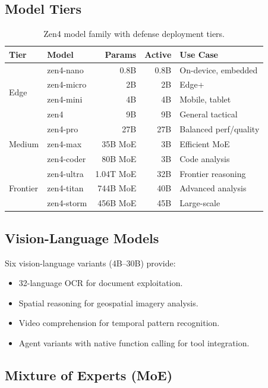\documentclass[11pt,letterpaper]{article}
\begin{document}
\subsection{Model Tiers}

\begin{table}[H]
\centering
\small
\begin{tabular}{@{}llrrl@{}}
\toprule
\textbf{Tier} & \textbf{Model} & \textbf{Params} & \textbf{Active} & \textbf{Use Case} \\
\midrule
\multirow{4}{*}{Edge} & zen4-nano & 0.8B & 0.8B & On-device, embedded \\
 & zen4-micro & 2B & 2B & Edge+ \\
 & zen4-mini & 4B & 4B & Mobile, tablet \\
 & zen4 & 9B & 9B & General tactical \\
\midrule
\multirow{3}{*}{Medium} & zen4-pro & 27B & 27B & Balanced perf/quality \\
 & zen4-max & 35B MoE & 3B & Efficient MoE \\
 & zen4-coder & 80B MoE & 3B & Code analysis \\
\midrule
\multirow{3}{*}{Frontier} & zen4-ultra & 1.04T MoE & 32B & Frontier reasoning \\
 & zen4-titan & 744B MoE & 40B & Advanced analysis \\
 & zen4-storm & 456B MoE & 45B & Large-scale \\
\bottomrule
\end{tabular}
\caption{Zen4 model family with defense deployment tiers.}
\label{tab:zen-family}
\end{table}

\subsection{Vision-Language Models}

Six vision-language variants (4B--30B) provide:
\begin{itemize}
\item 32-language OCR for document exploitation.
\item Spatial reasoning for geospatial imagery analysis.
\item Video comprehension for temporal pattern recognition.
\item Agent variants with native function calling for tool integration.
\end{itemize}

\subsection{Mixture of Experts (MoE)}
\end{document}

